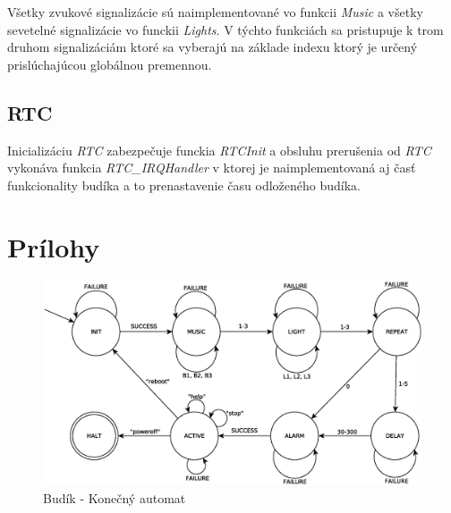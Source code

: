 \documentclass[11pt,a4paper]{article}
\begin{document}
        \indent Všetky zvukové signalizácie sú naimplementované vo funkcii \textit{Music} a všetky sevetelné signalizácie vo funckii \textit{Lights}. V týchto funkciách sa pristupuje k trom druhom signalizáciám ktoré sa vyberajú na základe indexu ktorý je určený prislúchajúcou globálnou premennou.

    \subsection{RTC}

        \indent Inicializáciu \textit{RTC} zabezpečuje funckia \textit{RTCInit} a obsluhu prerušenia od \textit{RTC} vykonáva funkcia \textit{RTC\_IRQHandler} v ktorej je naimplementovaná aj časť funkcionality budíka a to prenastavenie času odloženého budíka.
  
\newpage
\section{Prílohy}

\begin{figure}[H]
    \centering
    \includegraphics[scale=0.55]{img/fsm.eps}
    \caption{Budík - Konečný automat}
    \label{fig:fsm}
\end{figure}

\newpage %

\makeatletter
\makeatother

\begin{flushleft}
    
\end{flushleft}
\end{document}
